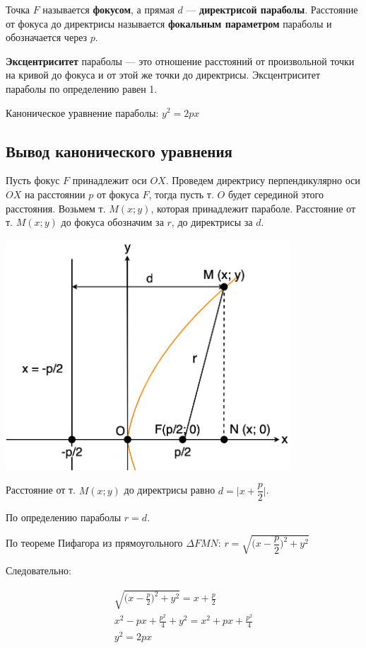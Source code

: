 \documentclass[a4paper,12pt]{extbook}
\theoremstyle{numbered}
\theoremstyle{named}
\theoremstyle{named}
\theoremstyle{named}
\begin{document}
Точка \(F\) называется \textbf{фокусом}, а прямая \(d\) — \textbf{директрисой параболы}.
Расстояние от фокуса до директрисы называется \textbf{фокальным параметром} параболы и обозначается через \(p\).

\textbf{Эксцентриситет} параболы — это отношение расстояний от произвольной точки на кривой до фокуса и от этой же точки до директрисы.
Эксцентриситет параболы по определению равен 1.

Каноническое уравнение параболы: \(y^2 = 2px\)

\subsection*{Вывод канонического уравнения}

Пусть фокус \(F\) принадлежит оси \(OX\).
Проведем директрису перпендикулярно оси \(OX\) на расстоянии \(p\) от фокуса \(F\), тогда пусть т. \(O\) будет серединой этого расстояния.
Возьмем т. \(M(x; y)\), которая принадлежит параболе.
Расстояние от т. \(M(x; y)\) до фокуса обозначим за \(r\), до директрисы за \(d\).

\begin{center}
    \includegraphics[width=0.8\textwidth]{parabola.png}
\end{center}

Расстояние от т. \(M(x;y)\) до директрисы равно \(d = \Big| x + \dfrac{p}{2} \Big| \).

По определению параболы \(r = d\).

По теореме Пифагора из прямоугольного \(\Delta FMN\): \(r=\sqrt{\Big(x - \dfrac{p}{2}\Big)^2 + y^2}\)

Следовательно:

\begin{gather*}
    \sqrt{\Big(x - \frac{p}{2}\Big)^2 + y^2} = x + \frac{p}{2} \\
    x^2 - px + \frac{p^2}{4} + y^2 = x^2 + px + \frac{p^2}{4} \\
    y^2 = 2px
\end{gather*}
\end{document}
